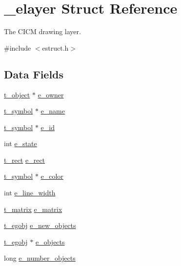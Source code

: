 \hypertarget{struct__elayer}{\section{\-\_\-elayer Struct Reference}
\label{struct__elayer}
}


The C\-I\-C\-M drawing layer.  




{\ttfamily \#include $<$estruct.\-h$>$}

\subsection*{Data Fields}
\begin{DoxyCompactItemize}
\item 
\hyperlink{struct__text}{t\-\_\-object} $\ast$ \hyperlink{struct__elayer_a2a35e154dc0053b0c8078d322ee1b5e3}{e\-\_\-owner}
\item 
\hyperlink{struct__symbol}{t\-\_\-symbol} $\ast$ \hyperlink{struct__elayer_a6d8c2140844c7949fe9bc0384b2129d8}{e\-\_\-name}
\item 
\hyperlink{struct__symbol}{t\-\_\-symbol} $\ast$ \hyperlink{struct__elayer_a1f5d3d53b83fa9009ede11f8a9902dff}{e\-\_\-id}
\item 
int \hyperlink{struct__elayer_a6ebb09ffbaedff41ff95d74f7ebdb71b}{e\-\_\-state}
\item 
\hyperlink{struct__rect}{t\-\_\-rect} \hyperlink{struct__elayer_aaef55281ce06e8d04077acd1e73e484e}{e\-\_\-rect}
\item 
\hyperlink{struct__symbol}{t\-\_\-symbol} $\ast$ \hyperlink{struct__elayer_a13dfb00aea95e0dc5b9d1297260a9280}{e\-\_\-color}
\item 
int \hyperlink{struct__elayer_a4f088d61988de49543e814d4b5a74947}{e\-\_\-line\-\_\-width}
\item 
\hyperlink{struct__matrix}{t\-\_\-matrix} \hyperlink{struct__elayer_a62d53e14693deed3469c69dc3a857493}{e\-\_\-matrix}
\item 
\hyperlink{struct__egobj}{t\-\_\-egobj} \hyperlink{struct__elayer_a793a735e42cff87ab0df8772c76fe039}{e\-\_\-new\-\_\-objects}
\item 
\hyperlink{struct__egobj}{t\-\_\-egobj} $\ast$ \hyperlink{struct__elayer_a6f0b120b9e9be17af36ba96a368ffccb}{e\-\_\-objects}
\item 
long \hyperlink{struct__elayer_ad5b10c31f81ecf9116b72b70b25f9e79}{e\-\_\-number\-\_\-objects}
\end{DoxyCompactItemize}


